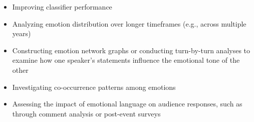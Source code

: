 \documentclass[pdflatex,sn-mathphys-num]{sn-jnl}%
\begin{document}
\begin{itemize}
	\item Improving classifier performance 
	\item Analyzing emotion distribution over longer timeframes (e.g., across multiple years)
	\item Constructing emotion network graphs or conducting turn-by-turn analyses to examine how one speaker’s statements influence the emotional tone of the other
	\item Investigating co-occurrence patterns among emotions
	\item Assessing the impact of emotional language on audience responses, such as through comment analysis or post-event surveys
\end{itemize}
\end{document}
